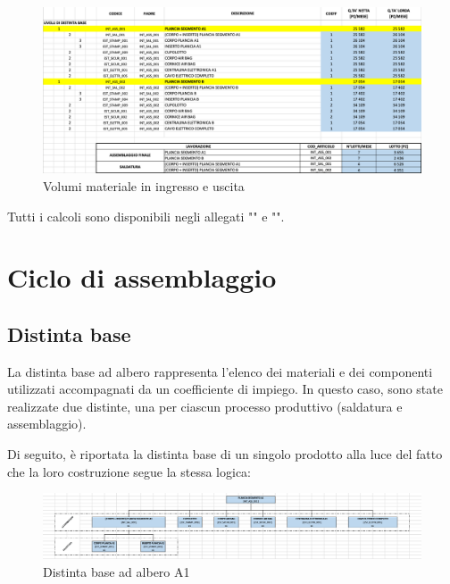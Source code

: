 \documentclass[11pt]{article}
\begin{document}
\begin{figure}[H]
    \centering
    \includegraphics[width=\textwidth]{images/Volumi materiale in ingresso e uscita.png}
    \caption{Volumi materiale in ingresso e uscita}
    \label{fig: Volumi materiale in ingresso e uscita}
\end{figure}

\noindent
Tutti i calcoli sono disponibili negli allegati "" e "".
\newpage


\section{Ciclo di assemblaggio}
\subsection{Distinta base}
La distinta base ad albero rappresenta l'elenco dei materiali e dei componenti utilizzati accompagnati da un coefficiente di impiego.
In questo caso, sono state realizzate due distinte, una per ciascun processo produttivo (saldatura e assemblaggio).

Di seguito, è riportata la distinta base di un singolo prodotto alla luce del fatto che la loro costruzione segue la stessa logica:
\begin{figure} [H]
    \centering
    \includegraphics[width=\textwidth]{images/Distinta base A1.png}
    \caption{Distinta base ad albero A1}
    \label{fig: Distinta base ad albero A1}
\end{figure}
\end{document}
